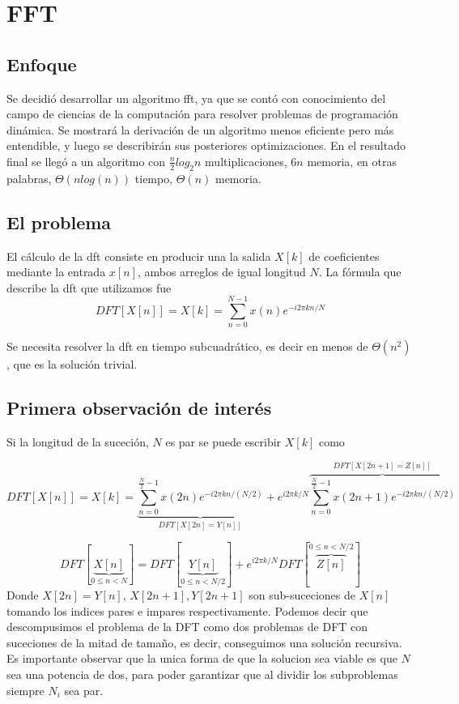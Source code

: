 \documentclass[assd_tp2_main.tex]{subfiles}
\begin{document}
\section{FFT}

\subsection{Enfoque}
Se decidió desarrollar un algoritmo fft, ya que se contó con conocimiento del campo de ciencias de la computación para resolver problemas de programación dinámica. Se mostrará la derivación de un algoritmo menos eficiente pero más entendible, y luego se describirán sus posteriores optimizaciones.
En el resultado final se llegó a un algoritmo con $\frac{n}{2}log_2{n}$ multiplicaciones, $6n$ memoria, en otras palabras, 
$\Theta(nlog(n))$ tiempo, $\Theta(n)$ memoria. 

\subsection{El problema}
El cálculo de la dft consiste en producir una la salida $X[k]$ de coeficientes mediante la entrada $x[n]$, ambos arreglos de igual longitud $N$. La fórmula que describe la dft que utilizamos fue
\begin{equation}
	DFT[X[n]] = X[k]=\sum_{n=0}^{N-1}x(n)e^{-i2\pi kn/N}
\end{equation}

Se necesita resolver la dft en tiempo subcuadrático, es decir en menos de $\Theta(n^2)$, que es la solución trivial.

\subsection{Primera observación de interés}
Si la longitud de la suceción, $N$ es par se puede escribir $X[k]$ como

\begin{equation}
	DFT[X[n]] = X[k]=
		\underbrace{
		\sum_{n=0}^{\frac{N}{2}-1}x(2n)e^{-i2\pi k n/(N/2)}
		}_{DFT[X[2n]=Y[n]]} +
		e^{i2\pi k /N}
		\overbrace{		
		\sum_{n=0}^{\frac{N}{2}-1}x(2n+1)e^{-i2\pi k n/(N/2)}
		}^{DFT[X[2n+1] = Z[n]]}
\end{equation}

\begin{equation}
	DFT[\underbrace{X[n]}_{0\leq n< N}]=DFT[\underbrace{Y[n]}_{0\leq n<N/2}]+e^{i2\pi k /N}DFT[\overbrace{Z[n]}^{0\leq n<N/2}]
\end{equation}
Donde $X[2n]=Y[n]$, $X[2n+1], Y[2n+1]$ son sub-suceciones de $X[n]$ tomando los indices pares e impares respectivamente.
Podemos decir que descompusimos el problema de la DFT como dos problemas de DFT con suceciones de la mitad de tamaño, es decir, conseguimos una solución recursiva. Es importante observar que la unica forma de que la solucion sea viable es que $N$ sea una potencia de dos, para poder garantizar que al dividir los subproblemas siempre $N_i$ sea par.
\end{document}
